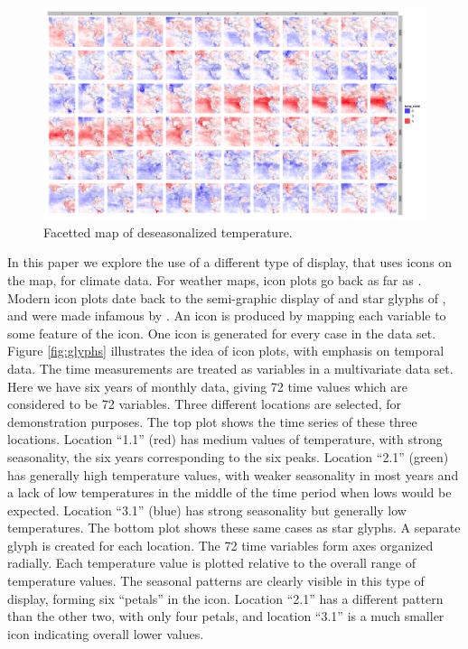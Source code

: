 \documentclass[oneside]{article}
\begin{document}
\begin{figure}[htp]
\centerline{\includegraphics[width=6in]{nasa-colored-map.png}}
\caption{Facetted map of deseasonalized temperature.}
\label{fig:facetted-map}
\end{figure}

In this paper we explore the use of a different type of display, that uses icons on the map, for climate data.  For weather maps, icon plots go back as far as \citet{galton:weathermap}. Modern icon plots date back to the semi-graphic display of \citet{anderson:1960} and star glyphs of  \citep{kleiner:1981}, and were made infamous by \citep{chernoff:1973}. An icon is produced by mapping each variable to some feature of the icon. One icon is generated for every case in the data set. Figure \ref{fig:glyphs} illustrates the idea of icon plots, with emphasis on temporal data. The time measurements are treated as variables in a multivariate data set. Here we have six years of monthly data, giving 72 time values which are considered to be 72 variables. Three different locations are selected, for demonstration purposes. The top plot shows the time series of these three locations. Location ``1.1'' (red) has medium values of temperature, with strong seasonality, the six years corresponding to the six peaks. Location ``2.1'' (green) has generally high temperature values, with weaker seasonality in most years and a lack of low temperatures in the middle of the time period when lows would be expected. Location ``3.1'' (blue) has strong seasonality but generally low temperatures. The bottom plot shows these same cases as star glyphs. A separate glyph is created for each location. The 72 time variables form axes organized radially. Each temperature value is plotted relative to the overall range of temperature values. The seasonal patterns are clearly visible in this type of display, forming six ``petals'' in the icon. Location ``2.1'' has a different pattern than the other two, with only four petals, and location ``3.1'' is a much smaller icon indicating overall lower values. 
\end{document}
